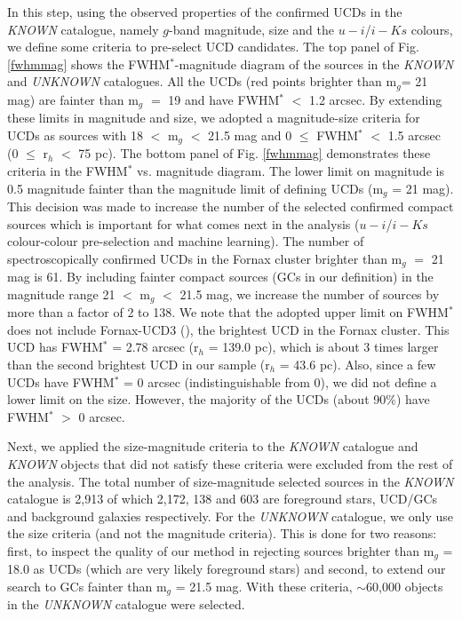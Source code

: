 \documentclass[fleqn,usenatbib]{mnras}
\begin{document}
In this step, using the observed properties of the confirmed UCDs in the \textit{KNOWN} catalogue, namely $g$-band magnitude, size and the $u-i$/$i-Ks$ colours, we define some criteria to pre-select UCD candidates. The top panel of Fig. \ref{fwhmmag} shows the FWHM$^*$-magnitude diagram of the sources in the \textit{KNOWN} and \textit{UNKNOWN} catalogues. All the
UCDs (red points brighter than m$_{g}$= 21 mag) are fainter than m$_{g}$ $=$ 19 and have FWHM$^*$ $<$ 1.2 arcsec. By extending these limits in magnitude and size, we adopted a magnitude-size criteria for UCDs as sources with 18 $<$ m$_g$ $<$ 21.5 mag and 0 $\leq$ FWHM$^*$ $<$ 1.5 arcsec (0 $\leq$ r$_h$ $<$ 75 pc). The bottom panel of Fig. \ref{fwhmmag} demonstrates these criteria in the FWHM$^*$ vs. magnitude diagram. The lower limit on magnitude is 0.5 magnitude fainter than the magnitude limit of defining UCDs (m$_g$ = 21 mag). This decision was made to increase the number of the selected confirmed compact sources which is important for what comes next in the analysis ($u-i$/$i-Ks$ colour-colour pre-selection and machine learning). The number of spectroscopically confirmed UCDs in the Fornax cluster brighter than m$_g$ $=$ 21 mag is 61. By including fainter compact sources (GCs in our definition) in the magnitude range 21 $<$ m$_g$ $<$ 21.5 mag, we increase the number of sources by more than a factor of 2 to 138. We note that the adopted upper limit on FWHM$^*$ does not include Fornax-UCD3 (\citealp{drinkwater2000}), the brightest UCD in the Fornax cluster. This UCD has FWHM$^*$ = 2.78 arcsec (r$_h$ = 139.0 pc), which is about 3 times larger than the second brightest UCD in our sample (r$_h$ = 43.6 pc). Also, since a few UCDs have FWHM$^*$ = 0 arcsec (indistinguishable from 0), we did not define a lower limit on the size. However, the majority of the UCDs (about 90\%) have FWHM$^*$ $>$ 0 arcsec. 

Next, we applied the size-magnitude criteria to the \textit{KNOWN} catalogue and \textit{KNOWN} objects that did not satisfy these criteria were excluded from the rest of the analysis. The total number of size-magnitude selected sources in the \textit{KNOWN} catalogue is 2,913 of which 2,172, 138 and 603 are foreground stars, UCD/GCs and background galaxies respectively. For the \textit{UNKNOWN} catalogue, we only use the size criteria (and not the magnitude criteria). This is done for two reasons: first, to inspect the quality of our method in rejecting sources brighter than m$_g$ = 18.0 as UCDs (which are very likely foreground stars) and second, to extend our search to GCs fainter than m$_g$ = 21.5 mag. With these criteria, $\sim$60,000 objects in the \textit{UNKNOWN} catalogue were selected.
\end{document}
